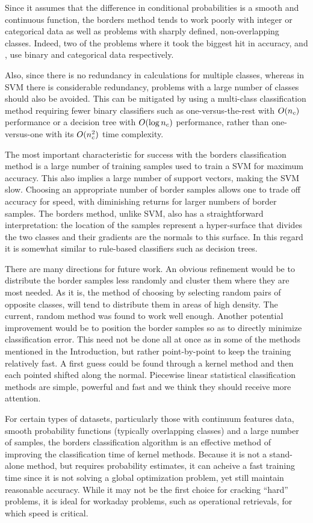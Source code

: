 Since it assumes that the difference in conditional probabilities is a
smooth and continuous function, the borders method 
tends to work poorly with integer or categorical data as well as problems
with sharply defined, non-overlapping classes.
Indeed, two of the problems where it took the biggest hit in accuracy,  and , 
use binary and categorical data respectively.

Also, since there is no redundancy in calculations for multiple classes, 
whereas in SVM there is considerable redundancy, problems with a large number of
classes should also be avoided.
This can be mitigated by using a multi-class classification method
requiring fewer binary classifiers such as one-versus-the-rest with $O(n_c)$
performance or a decision tree with $O(\log n_c)$ performance, rather than
one-versus-one with its $O(n_c^2)$ time complexity.

The most important characteristic for success with the borders classification 
method is a large number of training samples
used to train a SVM for maximum accuracy.
This also implies a large number of support vectors, making the
SVM slow.
Choosing an appropriate number of border samples allows one to trade off
accuracy for speed, with diminishing returns for larger numbers of border samples.
The borders method, unlike SVM, also has a straightforward interpretation:
the location of the samples represent a hyper-surface that divides the two
classes and their gradients are the normals to this surface.
In this regard it is somewhat similar to rule-based classifiers such as
decision trees.

There are many directions for future work.
An obvious refinement would be to distribute the border samples less 
randomly and cluster them where they are most needed.
As it is, the method of choosing by selecting random pairs of opposite
classes, will tend to distribute them in areas of high density.
The current, random method was found to work well enough.
Another potential improvement would be to position the border samples
so as to directly minimize classification error.
This need not be done all at once as in some of the methods mentioned
in the Introduction, but rather point-by-point to keep the training
relatively fast.
A first guess could be found through a kernel method and then each
pointed shifted along the normal.
Piecewise linear statistical classification methods are simple, 
powerful and fast and we think they should receive more attention.

For certain types of datasets, particularly those with continuum features
data, smooth probability functions (typically overlapping classes) and a large number of samples, 
the borders classification algorithm is an 
effective method of improving the classification time of kernel methods.
Because it is not a stand-alone method, but requires probability estimates,
it can acheive a fast training time since it is not solving a global
optimization problem, yet still maintain reasonable accuracy.
While it may not be the first choice for cracking ``hard'' problems, it
is ideal for workaday problems, such as operational retrievals,
for which speed is critical.

